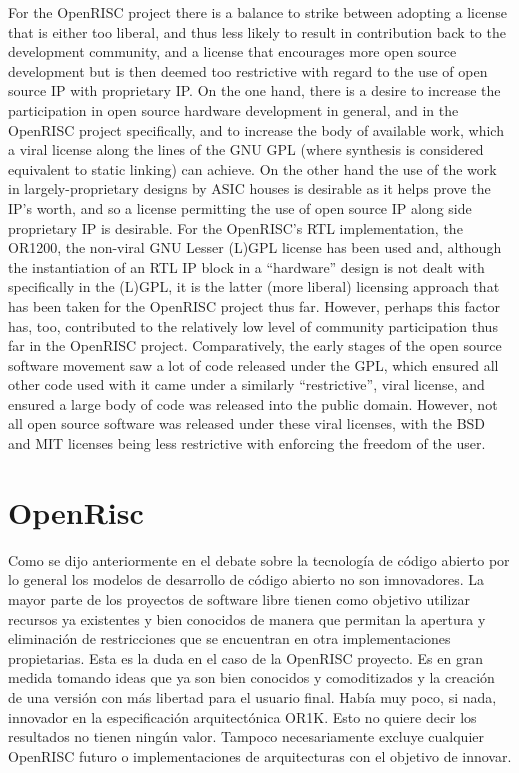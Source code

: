 For the OpenRISC project there is a balance to strike between adopting a license
that is either too liberal, and thus less likely to result in contribution back to
the development community, and a license that encourages more open source development
but is then deemed too restrictive with regard to the use of open source
IP with proprietary IP. On the one hand, there is a desire to increase the participation
in open source hardware development in general, and in the OpenRISC
project specifically, and to increase the body of available work, which a viral license
along the lines of the GNU GPL (where synthesis is considered equivalent to static
linking) can achieve. On the other hand the use of the work in largely-proprietary
designs by ASIC houses is desirable as it helps prove the IP’s worth, and so a license
permitting the use of open source IP along side proprietary IP is desirable.
For the OpenRISC’s RTL implementation, the OR1200, the non-viral GNU Lesser
(L)GPL license has been used and, although the instantiation of an RTL IP block
in a “hardware” design is not dealt with specifically in the (L)GPL, it is the latter
(more liberal) licensing approach that has been taken for the OpenRISC project
thus far.
However, perhaps this factor has, too, contributed to the relatively low level
of community participation thus far in the OpenRISC project. Comparatively,
the early stages of the open source software movement saw a lot of code released
under the GPL, which ensured all other code used with it came under a similarly
“restrictive”, viral license, and ensured a large body of code was released into the
public domain. However, not all open source software was released under these viral
licenses, with the BSD and MIT licenses being less restrictive with enforcing the
freedom of the user.

\section{OpenRisc}

Como se dijo anteriormente en el debate sobre la tecnología de código abierto por lo general los modelos de desarrollo de código abierto no son imnovadores.
 La mayor parte de los proyectos de software libre tienen como objetivo utilizar recursos ya existentes y bien conocidos de manera que permitan la apertura y eliminación de restricciones que se encuentran en otra implementaciones propietarias. Esta es la duda en el caso de la OpenRISC proyecto. Es en gran medida tomando ideas que ya son bien conocidos y comoditizados
y la creación de una versión con más libertad para el usuario final. Había muy poco, si
nada, innovador en la especificación arquitectónica OR1K. Esto no quiere decir
los resultados no tienen ningún valor. Tampoco necesariamente excluye cualquier OpenRISC futuro
o implementaciones de arquitecturas con el objetivo de innovar.

